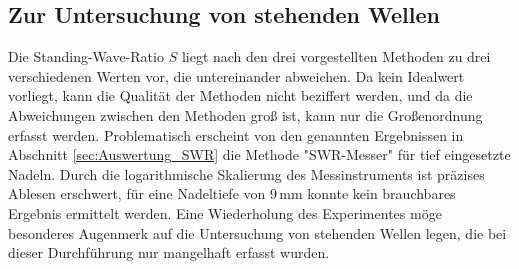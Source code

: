 \subsection{Zur Untersuchung von stehenden Wellen}
Die Standing-Wave-Ratio $S$ liegt nach den drei vorgestellten Methoden zu drei verschiedenen Werten vor, die untereinander abweichen.
Da kein Idealwert vorliegt, kann die Qualität der Methoden nicht beziffert werden, und da die Abweichungen zwischen den Methoden groß ist, kann nur die Großenordnung erfasst werden.
Problematisch erscheint von den genannten Ergebnissen in Abschnitt \ref{sec:Auswertung_SWR} die Methode "SWR-Messer" für tief eingesetzte Nadeln. 
Durch die logarithmische Skalierung des Messinstruments ist präzises Ablesen erschwert, für eine Nadeltiefe von 9\,mm konnte kein brauchbares Ergebnis ermittelt werden.
Eine Wiederholung des Experimentes möge besonderes Augenmerk auf die Untersuchung von stehenden Wellen legen, die bei dieser Durchführung nur mangelhaft erfasst wurden. 